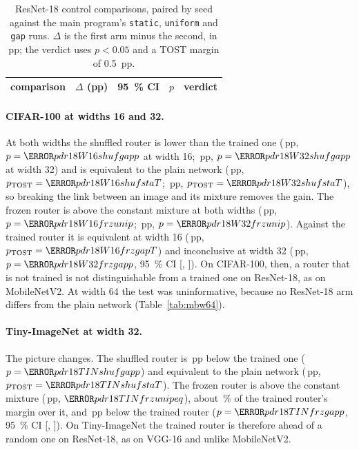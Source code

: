 \documentclass[10pt,a4paper]{article}
\begin{document}
\begin{table}[!htbp]\centering\small
\caption{ResNet-18 control comparisons, paired by seed against the main
program's \texttt{static}, \texttt{uniform} and \texttt{gap} runs. $\Delta$ is
the first arm minus the second, in pp; the verdict uses $p<0.05$ and a TOST
margin of \SI{0.5}{pp}.}
\label{tab:r18ctrl}
\begin{tabular}{l r l l l}
\toprule
comparison & $\Delta$ (pp) & \SI{95}{\percent} CI & $p$ & verdict \\
\midrule
\bottomrule
\end{tabular}
\end{table}

\paragraph{CIFAR-100 at widths 16 and 32.} At both widths the shuffled
router is lower than the trained one (\,pp, $p=\V{pdr18W16shufgapp}$ at width 16;
\,pp, $p=\V{pdr18W32shufgapp}$ at width 32) and is
equivalent to the plain network (\,pp, $p_{\text{TOST}}=\V{pdr18W16shufstaT}$;
\,pp, $p_{\text{TOST}}=\V{pdr18W32shufstaT}$), so breaking
the link between an image and its mixture removes the gain. The frozen router
is above the constant mixture at both widths (\,pp,
$p=\V{pdr18W16frzunip}$; \,pp, $p=\V{pdr18W32frzunip}$). Against
the trained router it is equivalent at width 16 (\,pp,
$p_{\text{TOST}}=\V{pdr18W16frzgapT}$) and inconclusive at width 32
(\,pp, $p=\V{pdr18W32frzgapp}$, \SI{95}{\percent} CI
[, ]). On CIFAR-100, then, a router that is not
trained is not distinguishable from a trained one on ResNet-18, as on
MobileNetV2. At width 64 the test was uninformative, because no ResNet-18 arm
differs from the plain network (Table~\ref{tab:mbw64}).

\paragraph{Tiny-ImageNet at width 32.} The picture changes. The shuffled
router is \,pp below the trained one ($p=\V{pdr18TINshufgapp}$) and equivalent to the
plain network (\,pp, $p_{\text{TOST}}=\V{pdr18TINshufstaT}$). The frozen
router is above the constant mixture (\,pp,
$\V{pdr18TINfrzunipeq}$), about \,\% of the trained router's margin
over it, and \,pp below the trained router
($p=\V{pdr18TINfrzgapp}$, \SI{95}{\percent} CI [,
]). On Tiny-ImageNet the trained router is therefore ahead
of a random one on ResNet-18, as on VGG-16 and unlike MobileNetV2.
\end{document}
